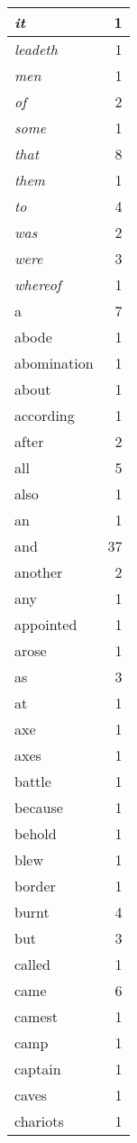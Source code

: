 \begin{center}
\begin{longtable}{l|r}
\emph{it} & 1 \\ \hline
\emph{leadeth} & 1 \\ \hline
\emph{men} & 1 \\ \hline
\emph{of} & 2 \\ \hline
\emph{some} & 1 \\ \hline
\emph{that} & 8 \\ \hline
\emph{them} & 1 \\ \hline
\emph{to} & 4 \\ \hline
\emph{was} & 2 \\ \hline
\emph{were} & 3 \\ \hline
\emph{whereof} & 1 \\ \hline
a & 7 \\ \hline
abode & 1 \\ \hline
abomination & 1 \\ \hline
about & 1 \\ \hline
according & 1 \\ \hline
after & 2 \\ \hline
all & 5 \\ \hline
also & 1 \\ \hline
an & 1 \\ \hline
and & 37 \\ \hline
another & 2 \\ \hline
any & 1 \\ \hline
appointed & 1 \\ \hline
arose & 1 \\ \hline
as & 3 \\ \hline
at & 1 \\ \hline
axe & 1 \\ \hline
axes & 1 \\ \hline
battle & 1 \\ \hline
because & 1 \\ \hline
behold & 1 \\ \hline
blew & 1 \\ \hline
border & 1 \\ \hline
burnt & 4 \\ \hline
but & 3 \\ \hline
called & 1 \\ \hline
came & 6 \\ \hline
camest & 1 \\ \hline
camp & 1 \\ \hline
captain & 1 \\ \hline
caves & 1 \\ \hline
chariots & 1 \\ \hline

\end{longtable}
\end{center}
